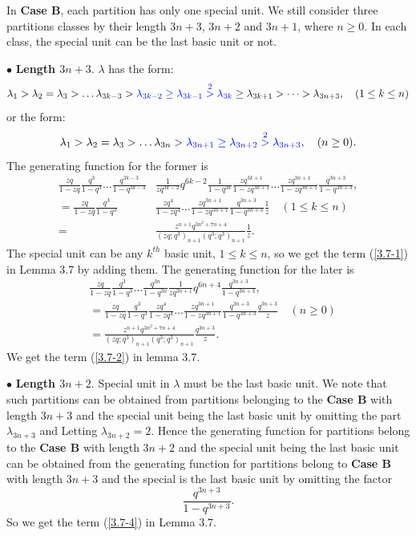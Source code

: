 \documentclass[draft]{amsart}
\numberwithin{equation}{section}
\theoremstyle{plain}
\theoremstyle{remark}
\begin{document}

In  \textbf{Case B},  each partition has  only one special unit. We still consider three partitions classes by their length $3n+3$, $3n+2$ and $3n+1$, where $n\geq 0$. In each class, the special unit can be the last basic unit or not.

$\bullet$ {\bf Length $3n+3.$}
$\lambda$ has the form:
$$
\lambda_{1}>\lambda_{2}=\lambda_{3}>\dots\lambda_{3k-3}>{\color{blue}\lambda_{3k-2}\geq \lambda_{3k-1}\overset{2}{>}\lambda_{3k}}\geq\lambda_{3k+1}>\dots>\lambda_{3n+3}, \quad(1\leq k\leq n)
$$
or the form:
$$
\lambda_{1}>\lambda_{2}=\lambda_{3}>\dots\lambda_{3n}>{\color{blue}\lambda_{3n+1}\geq \lambda_{3n+2}\overset{2}{>}\lambda_{3n+3}}, \quad(n \geq 0).
$$
The generating function for the former is
\begin{align*}
\frac{zq}{1-zq}\frac{q^{3}}{1-q^{3}}\dots\frac{q^{3k-3}}{1-q^{3k-3}}&\frac{1}{zq^{3k-2}}q^{6k-2}\frac{1}{1-q^{3k}}\frac{zq^{3k+1}}{1-zq^{3k+1}}\dots\frac{zq^{3n+1}}{1-zq^{3n+1}}\frac{q^{3n+3}}{1-q^{3n+3}},\\
=\frac{zq}{1-zq}\frac{q^{3}}{1-q^{3}}& \frac{zq^{4}}{1-zq^{4}}\dots\frac{zq^{3n+1}}{1-zq^{3n+1}} \frac{q^{3n+3}}{1-q^{3n+3}}\frac{1}{z} \quad(1\leq k \leq n)\\
=&\frac{z^{n+1}q^{3n^{2}+7n+4}}{(zq;q^{3})_{n+1}(q^{3};q^{3})_{n+1}}\frac{1}{z}.
\end{align*}
The special unit can be any $k^{th}$ basic unit, $1\leq k\leq n$,
so we get the term (\ref{3.7-1}) in Lemma 3.7 by adding them.
The generating function for the later is
\begin{align*}
&\frac{zq}{1-zq}\frac{q^{3}}{1-q^{3}}\dots\frac{q^{3n}}{1-q^{3n}}\frac{1}{zq^{3n+1}}q^{6n+4}\frac{q^{3n+3}}{1-q^{3n+3}},\\
&=\frac{zq}{1-zq}\frac{q^{3}}{1-q^{3}} \frac{zq^{4}}{1-zq^{4}}\dots\frac{zq^{3n+1}}{1-zq^{3n+1}} \frac{q^{3n+3}}{1-q^{3n+3}}\frac{q^{3n+3}}{z}\quad (n\geq 0)\\
&=\frac{z^{n+1}q^{3n^{2}+7n+4}}{(zq;q^{3})_{n+1}(q^{3};q^{3})_{n+1}}\frac{q^{3n+3}}{z}.
\end{align*}
We get the term (\ref{3.7-2}) in lemma 3.7. 

$\bullet$ {\bf Length $3n+2.$}
Special unit  in $\lambda$ must be the last basic unit. We note that such partitions can be obtained from partitions belonging to the {\bf Case B} with length $3n+3$  and the special unit being the last basic unit by omitting the part $\lambda_{3n+3}$ and Letting $\lambda_{3n+2}=2$. Hence the generating function for partitions belong to the {\bf Case B} with length $3n+2$ and the special unit being the last basic unit can be obtained from the generating function for partitions belong to {\bf Case B}  with length $3n+3$ and the special is the last basic unit  by omitting the factor $$\frac{q^{3n+3}}{1-q^{3n+3}}.$$  So we get the term (\ref{3.7-4}) in Lemma 3.7.
\end{document}
